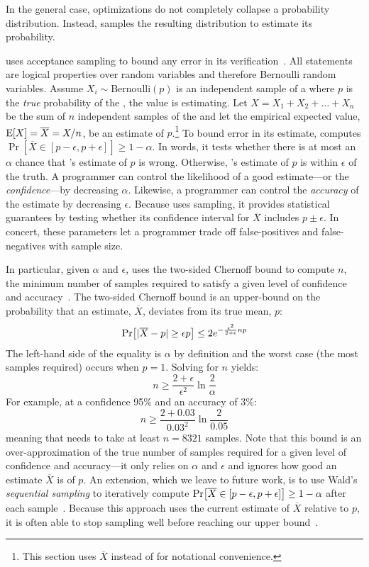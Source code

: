 In the general case, optimizations do not completely collapse a probability
distribution. Instead, \tool samples the resulting distribution to estimate its
probability.

\tool uses acceptance sampling to bound any error in its
verification~\cite{Younes}.  All \passert statements are logical
properties over random variables and therefore Bernoulli random
variables. Assume $X_i \sim \mathrm{Bernoulli}(p)$ is an independent sample of
a \passert where $p$ is the \emph{true} probability of the \passert,
the value \tool is estimating.
%
Let $X = X_1 + X_2 + \dots + X_n$ be the sum of $n$ independent
samples of the \passert and let the empirical expected value,
$\mathrm{E}\!\left[X\right] = \overline{X} = X/n$, be an estimate of $p$.\footnote{This
  section uses $\overline{X}$ instead of  for notational
  convenience.}  To bound error in its estimate, \tool computes
$\Pr[\overline{X} \in [p - \epsilon, p + \epsilon]] \ge 1 - \alpha$.
In words, it tests whether there is at most an $\alpha$ chance that \tool's
estimate of $p$ is wrong. Otherwise, \tool's estimate of $p$ is within
$\epsilon$ of the truth.  A programmer can control the likelihood of a
good estimate---or the \emph{confidence}---by decreasing $\alpha$.
Likewise, a programmer can control the \emph{accuracy} of the estimate
by decreasing $\epsilon$. Because \tool uses sampling, it provides
statistical guarantees by testing whether its confidence
interval for $\overline{X}$ includes $p \pm
\epsilon$.  In concert, these parameters let a programmer trade off
false-positives and false-negatives with sample size.

In particular, given $\alpha$ and $\epsilon$, \tool uses the two-sided
Chernoff bound to compute $n$, the minimum number of samples required
to satisfy a given level of confidence and
accuracy~\cite{chernoff1952measure}. The two-sided Chernoff bound is
an upper-bound on the probability that an estimate, $\overline{X}$,
deviates from its true mean, $p$:
%
$$\Pr\!\left[|\overline{X} - p| \ge \epsilon p\right] \le 2 e^{-\frac{\epsilon^2}{2 + \epsilon} np}$$
%
The left-hand side of the equality is $\alpha$ by definition and the worst
case (the most samples required) occurs when $p = 1$. Solving for $n$ yields:
%
$$n \ge \frac{2+\epsilon}{\epsilon^2}\ln\frac{2}{\alpha}$$
%
For example, at a confidence 95\% and an accuracy of 3\%:
%
$$n \ge \frac{2+0.03}{0.03^2}\ln\frac{2}{0.05}$$
%
meaning that \tool needs to take at least $n=8321$ samples.  Note that this bound
is an over-approximation of the true number of samples required for a
given level of confidence and accuracy---it only relies on $\alpha$
and $\epsilon$ and ignores how good an estimate $\overline{X}$ is of $p$.
An extension, which we leave to future work, is to use Wald's
\emph{sequential sampling} to iteratively compute $\Pr\!\left[\overline{X}
    \in [p - \epsilon, p + \epsilon]\right] \ge 1 - \alpha$ after each
sample~\cite{wald1945sequential}. Because this approach uses the
current estimate of $\overline{X}$ relative to $p$, it is often able to
stop sampling well before reaching our
upper bound~\cite{Younes20061368}.

